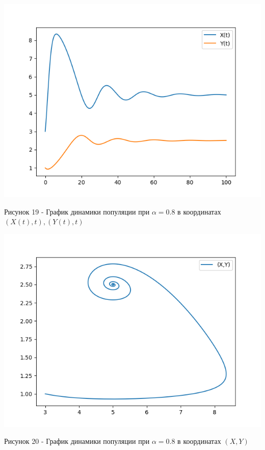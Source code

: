 \documentclass[a4paper,14pt]{extreport}
\begin{document}
\begin{center}
    \begin{minipage}[htb]{0.8\linewidth}
    \includegraphics[width=14cm]{n12.png}
    \end{minipage}
    \end{center}
    \begin{center}
        Рисунок 19 - График динамики популяции при $\alpha = 0.8$ в координатах $(X(t),t),(Y(t),t)$
    \end{center}
    \begin{center}
    \begin{minipage}[htb]{0.8\linewidth}
    \includegraphics[width=14cm]{12.png}
    \end{minipage}
    \end{center}
    \begin{center}
        Рисунок 20 - График динамики популяции при $\alpha = 0.8$ в координатах $(X,Y)$  
    \end{center}
\end{document}
